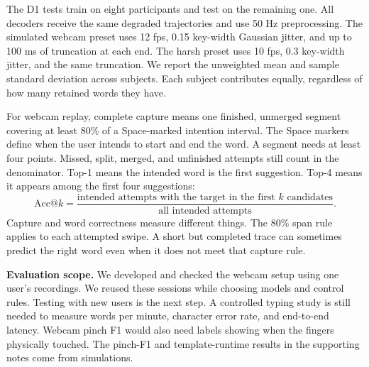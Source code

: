 \documentclass[preprint,12pt]{elsarticle}
\begin{document}
The D1 tests train on eight participants and test on the remaining one. All decoders receive the same degraded trajectories and use 50 Hz preprocessing. The simulated webcam preset uses 12 fps, 0.15 key-width Gaussian jitter, and up to 100 ms of truncation at each end. The harsh preset uses 10 fps, 0.3 key-width jitter, and the same truncation. We report the unweighted mean and sample standard deviation across subjects. Each subject contributes equally, regardless of how many retained words they have.

For webcam replay, complete capture means one finished, unmerged segment covering at least 80\% of a Space-marked intention interval. The Space markers define when the user intends to start and end the word. A segment needs at least four points. Missed, split, merged, and unfinished attempts still count in the denominator. Top-1 means the intended word is the first suggestion. Top-4 means it appears among the first four suggestions:
\begin{equation}
\mathrm{Acc@}k=\frac{\text{intended attempts with the target in the first }k\text{ candidates}}
{\text{all intended attempts}}.
\end{equation}
Capture and word correctness measure different things. The 80\% span rule applies to each attempted swipe. A short but completed trace can sometimes predict the right word even when it does not meet that capture rule.

\textbf{Evaluation scope.} We developed and checked the webcam setup using one user's recordings. We reused these sessions while choosing models and control rules. Testing with new users is the next step. A controlled typing study is still needed to measure words per minute, character error rate, and end-to-end latency. Webcam pinch F1 would also need labels showing when the fingers physically touched. The pinch-F1 and template-runtime results in the supporting notes come from simulations.
\end{document}
